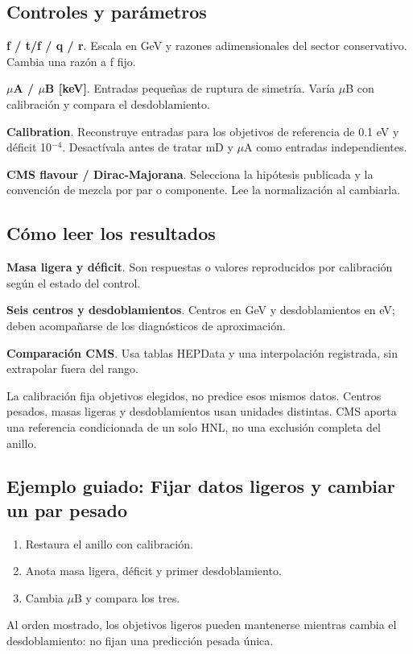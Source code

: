 \documentclass[11pt,a4paper]{article}
\begin{document}
\subsection*{Controles y parámetros}
\textbf{f / t/f / q / r}. Escala en GeV y razones adimensionales del sector conservativo. Cambia una razón a f fijo.

\textbf{\ensuremath{\mu}A / \ensuremath{\mu}B [keV]}. Entradas pequeñas de ruptura de simetría. Varía \ensuremath{\mu}B con calibración y compara el desdoblamiento.

\textbf{Calibration}. Reconstruye entradas para los objetivos de referencia de 0.1 eV y déficit 10\ensuremath{{}^{-4}}. Desactívala antes de tratar mD y \ensuremath{\mu}A como entradas independientes.

\textbf{CMS flavour / Dirac-Majorana}. Selecciona la hipótesis publicada y la convención de mezcla por par o componente. Lee la normalización al cambiarla.

\subsection*{Cómo leer los resultados}
\textbf{Masa ligera y déficit}. Son respuestas o valores reproducidos por calibración según el estado del control.

\textbf{Seis centros y desdoblamientos}. Centros en GeV y desdoblamientos en eV; deben acompañarse de los diagnósticos de aproximación.

\textbf{Comparación CMS}. Usa tablas HEPData y una interpolación registrada, sin extrapolar fuera del rango.

La calibración fija objetivos elegidos, no predice esos mismos datos. Centros pesados, masas ligeras y desdoblamientos usan unidades distintas. CMS aporta una referencia condicionada de un solo HNL, no una exclusión completa del anillo.
\subsection*{Ejemplo guiado: Fijar datos ligeros y cambiar un par pesado}
\begin{enumerate}
\item Restaura el anillo con calibración.
\item Anota masa ligera, déficit y primer desdoblamiento.
\item Cambia \ensuremath{\mu}B y compara los tres.
\end{enumerate}
Al orden mostrado, los objetivos ligeros pueden mantenerse mientras cambia el desdoblamiento: no fijan una predicción pesada única.
\end{document}
